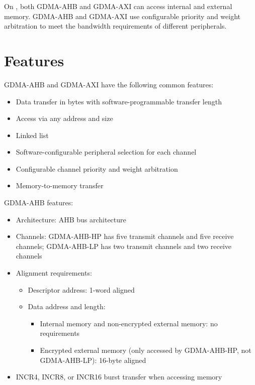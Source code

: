 \documentclass[main\_\_EN.tex]{subfiles}
\begin{document}
On \chipname{}, both GDMA-AHB and GDMA-AXI can access internal and external memory. GDMA-AHB and GDMA-AXI use configurable priority and weight arbitration to meet the bandwidth requirements of different peripherals.





\section{Features}

GDMA-AHB and GDMA-AXI have the following common features:

\begin{itemize}
    \item Data transfer in bytes with software-programmable transfer length
    \item Access via any address and size
    \item Linked list
    \item Software-configurable peripheral selection for each channel
    \item Configurable channel priority and weight arbitration
    \item Memory-to-memory transfer
\end{itemize}

GDMA-AHB features:

\begin{itemize}
    \item Architecture: AHB bus architecture
    \item Channels: GDMA-AHB-HP has five transmit channels and five receive channels; GDMA-AHB-LP has two transmit channels and two receive channels
    \item Alignment requirements:
        \begin{itemize}
            \item Descriptor address: 1-word aligned
            \item Data address and length:
                \begin{itemize}
                    \item Internal memory and non-encrypted external memory: no requirements
                    \item Encrypted external memory (only accessed by GDMA-AHB-HP, not GDMA-AHB-LP): 16-byte aligned
                \end{itemize}
        \end{itemize}
    \item INCR4, INCR8, or INCR16 burst transfer when accessing memory
\end{itemize}
\end{document}
